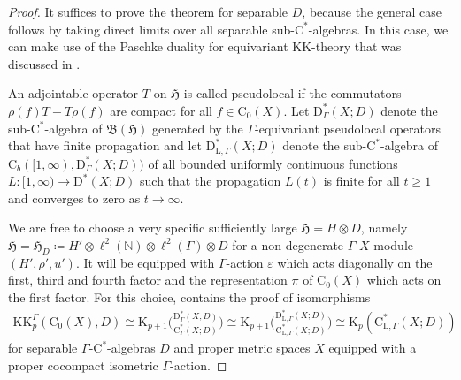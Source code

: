 \documentclass[11pt]{article}
\numberwithin{equation}{section}
\numberwithin{equation}{section}
\theoremstyle{definition}
\newcommand{\N}{\mathbb{N}}
\newcommand{\Ct}{\mathrm{C}}
\newcommand{\Cz}{\Ct_0}
\newcommand{\Cb}{\Ct_b}
\newcommand{\HilbertMod}{\mathfrak{H}}
\newcommand{\K}{\mathrm{K}}
\newcommand{\KK}{\mathrm{KK}}
\newcommand{\textCstar}{\ensuremath{\mathrm{C}^*\!}}
\newcommand{\Roe}{\mathrm{C}^*}
\newcommand{\PseudoLoc}{\mathrm{D}^*}
\newcommand{\Loc}{\mathrm{C}^*_{\mathrm{L},\Gamma}}
\newcommand{\PseudoLocLoc}{\mathrm{D}^*_{\mathrm{L},\Gamma}}
\newcommand{\Lin}{{\mathfrak{B}}}
\begin{document}
\begin{proof}
It suffices to prove the theorem for separable $D$, because the general case follows by taking direct limits over all separable sub-\textCstar-algebras.
In this case, we can make use of the Paschke duality for equivariant $\KK$-theory that was discussed in \cite[Appendix~B]{GueWillYu_DyncomplKtheory}.

An adjointable operator $T$ on $\HilbertMod$ is called pseudolocal if the commutators $\rho(f)T-T\rho(f)$ are compact for all $f\in \Cz(X)$.
Let $\PseudoLoc_\Gamma(X;D)$ denote the sub-\textCstar-algebra of $\Lin(\HilbertMod)$ generated by the $\Gamma$-equivariant pseudolocal operators that have finite propagation and let $\PseudoLocLoc(X;D)$ denote the sub-\textCstar-algebra of $\Cb([1,\infty),\PseudoLoc_\Gamma(X;D))$ of all bounded uniformly continuous functions $L\colon[1,\infty)\to\PseudoLoc(X;D)$ such that the propagation $L(t)$ is finite for all $t\geq 1$ and converges to zero as $t\to\infty$.

We are free to choose a very specific sufficiently large $\HilbertMod=H\otimes D$, namely $\HilbertMod=\HilbertMod_D\coloneqq H'\otimes \ell^2(\N)\otimes\ell^2(\Gamma)\otimes D$ for a non-degenerate $\Gamma$-$X$-module $(H',\rho',u')$.
It will be equipped with $\Gamma$-action $\varepsilon$ which acts diagonally on the first, third and fourth factor and the representation $\pi$ of $\Cz(X)$ which acts on the first factor.
For this choice, \cite[Appendix B]{GueWillYu_DyncomplKtheory} contains the proof of isomorphisms
\begin{gather*}
\KK_p^\Gamma(\Cz(X),D)\cong\K_{p+1}\biggl(\frac{\PseudoLoc_\Gamma(X;D)}{\Roe_\Gamma(X;D)}\biggr) \cong\K_{p+1}\biggl(\frac{\PseudoLocLoc(X;D)}{\Loc(X;D)}\biggr)\cong\K_p(\Loc(X;D))
\end{gather*}
for separable $\Gamma$-\textCstar-algebras $D$ and proper metric spaces $X$ equipped with a proper cocompact isometric $\Gamma$-action.



\end{proof}
\end{document}
